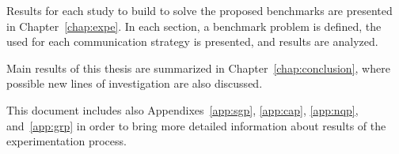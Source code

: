 Results for each study to build \posl{} \comstrs{} to solve the proposed benchmarks are presented in Chapter~\ref{chap:expe}. In each section, a benchmark problem is defined, the used \soset{} for each communication strategy is presented, and results are analyzed. %

Main results of this thesis are summarized in Chapter~\ref{chap:conclusion}, where possible new lines of investigation are also discussed.

This document includes also Appendixes~\ref{app:sgp}, \ref{app:cap}, \ref{app:nqp}, and~\ref{app:grp} in order to bring more detailed information about results of the experimentation process.
